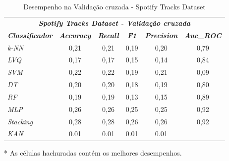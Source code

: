 \documentclass[journal]{IEEEtran}
\begin{document}
\begin{table}[h!]
	\caption{Desempenho na Validação cruzada - Spotify Tracks Dataset}
	\label{tab:21}
	\begin{threeparttable}
		\begin{tabular}{lccccc}
			\hline
			\multicolumn{6}{c}{\textit{\textbf{Spotify Tracks Dataset - Validação cruzada}}}                                                                                                                     \\
			\multicolumn{1}{l|}{\textit{\textbf{Classificador}}} & \textit{\textbf{Accuracy}} & \textit{\textbf{Recall}}  & \textit{\textbf{F1}}      & \textit{\textbf{Precision}} & \textit{\textbf{Auc\_ROC}} \\ \hline
			\multicolumn{1}{l|}{\textit{k-NN}}                   & 0,21                       & 0,21                      & 0,19                      & 0,20                        & 0,79                       \\
			\multicolumn{1}{l|}{\textit{LVQ}}                    & 0,17                       & 0,17                      & 0,15                      & 0,14                        & 0,84                       \\
			\multicolumn{1}{l|}{\textit{SVM}}                    & 0,22                       & 0,22                      & 0,19                      & 0,21                        & 0,09                       \\
			\multicolumn{1}{l|}{\textit{DT}}                     & 0,20                       & 0,20                      & 0,18                      & 0,19                        & 0,80                       \\
			\multicolumn{1}{l|}{\textit{RF}}                     & 0,19                       & 0,19                      & 0,13                      & 0,15                        & 0,89                       \\
			\multicolumn{1}{l|}{\textit{MLP}}                    & 0,26                       & 0,26                      & 0,25                      & 0,25                        & \cellcolor{lightgray}0,92  \\
			\multicolumn{1}{l|}{\textit{Stacking}}               & \cellcolor{lightgray}0,28  & \cellcolor{lightgray}0,28 & \cellcolor{lightgray}0,26 & \cellcolor{lightgray}0,26   & \cellcolor{lightgray}0,92  \\
			\multicolumn{1}{l|}{\textit{KAN}}                    & 0.01                       & 0.01                      & 0.01                      & 0.01                        &                            \\
			\hline
		\end{tabular}
		\begin{tablenotes}\footnotesize
			\item[*] As células hachuradas contém os melhores desempenhos.
		\end{tablenotes}
	\end{threeparttable}
\end{table}
\end{document}
